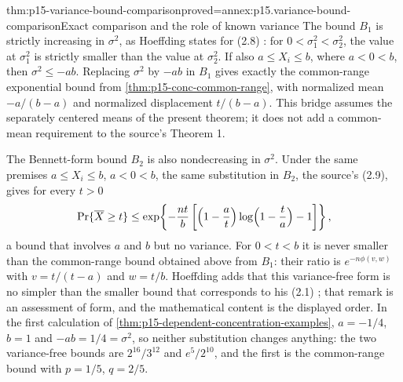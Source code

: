 \begin{hbtheorem}{thm:p15-variance-bound-comparison}{proved=annex:p15.variance-bound-comparison}{Exact comparison and the role of known variance}
The bound \(B_1\) is strictly increasing in \(\sigma^2\), as Hoeffding
states for (2.8) \cite[p.~20]{Hoeffding1963BoundedSums}: for
\(0<\sigma_1^2<\sigma_2^2\), the value at \(\sigma_1^2\) is strictly
smaller than the value at \(\sigma_2^2\).
If also \(a\leq X_i\leq b\), where \(a<0<b\), then
\(\sigma^2\leq-ab\). Replacing \(\sigma^2\) by \(-ab\) in \(B_1\)
gives exactly the common-range exponential bound from
\cref{thm:p15-conc-common-range}, with normalized mean
\(-a/(b-a)\) and normalized displacement \(t/(b-a)\).
This bridge assumes the separately centered means of the present theorem;
it does not add a common-mean requirement to the source's Theorem 1.

The Bennett-form bound \(B_2\) is also nondecreasing in \(\sigma^2\).
Under the same premises \(a\leq X_i\leq b\), \(a<0<b\), the same
substitution in \(B_2\), the source's (2.9), gives for every \(t>0\)
\[
 \Pr\{\overline X\geq t\}\leq
 \exp\!\left\{-\frac{nt}{b}
 \left[\Bigl(1-\frac at\Bigr)\log\Bigl(1-\frac ta\Bigr)-1\right]\right\},
\]
a bound that involves \(a\) and \(b\) but no variance. For \(0<t<b\) it is
never smaller than the common-range bound obtained above from \(B_1\):
their ratio is \(e^{-n\phi(v,w)}\) with \(v=t/(t-a)\) and \(w=t/b\).
Hoeffding adds that this variance-free form is no simpler than the
smaller bound that corresponds to his (2.1)
\cite[p.~20]{Hoeffding1963BoundedSums}; that remark is an assessment of
form, and the mathematical content is the displayed order.
In the first calculation of \cref{thm:p15-dependent-concentration-examples},
\(a=-1/4\), \(b=1\) and \(-ab=1/4=\sigma^2\), so neither substitution
changes anything: the two variance-free bounds are \(2^{16}/3^{12}\) and
\(e^5/2^{10}\), and the first is the common-range bound with \(p=1/5\),
\(q=2/5\).
\end{hbtheorem}

